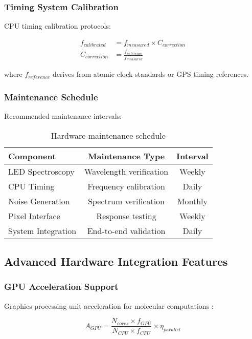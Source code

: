 \subsubsection{Timing System Calibration}

CPU timing calibration protocols:

\begin{align}
f_{calibrated} &= f_{measured} \times C_{correction} \\
C_{correction} &= \frac{f_{reference}}{f_{measured}}
\end{align}

where $f_{reference}$ derives from atomic clock standards or GPS timing references.

\subsubsection{Maintenance Schedule}

Recommended maintenance intervals:

\begin{table}[H]
\centering
\begin{tabular}{|l|c|c|}
\hline
\textbf{Component} & \textbf{Maintenance Type} & \textbf{Interval} \\
\hline
LED Spectroscopy & Wavelength verification & Weekly \\
CPU Timing & Frequency calibration & Daily \\
Noise Generation & Spectrum verification & Monthly \\
Pixel Interface & Response testing & Weekly \\
System Integration & End-to-end validation & Daily \\
\hline
\end{tabular}
\caption{Hardware maintenance schedule}
\end{table}

\subsection{Advanced Hardware Integration Features}

\subsubsection{GPU Acceleration Support}

Graphics processing unit acceleration for molecular computations \cite{stone2010opencl}:

\begin{equation}
A_{GPU} = \frac{N_{cores} \times f_{GPU}}{N_{CPU} \times f_{CPU}} \times \eta_{parallel}
\end{equation}

